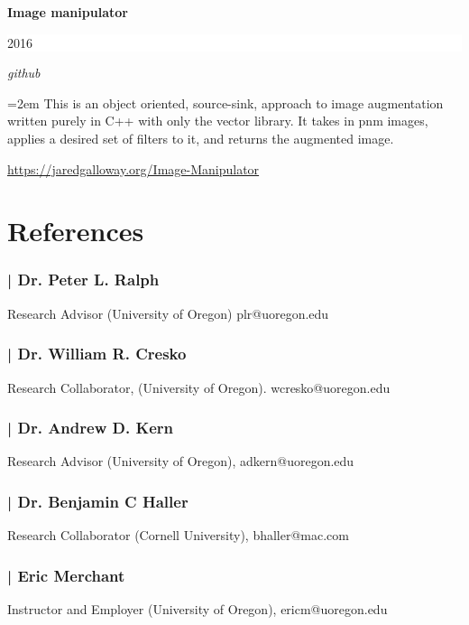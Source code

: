 \documentclass[paper=a4,fontsize=11pt]{scrartcl} %
\newcommand{\sepspace}{\vspace*{1em}}		%
\newcommand{\EducationEntry}[4]{
		\noindent \textbf{#1} \hfill      %
		\colorbox{White}{%
			\parbox{6em}{%
			\hfill\color{Black}#2}} \par  %
		\noindent \textit{#3} \par        %
		\noindent\hangindent=2em\hangafter=0 \small #4 %
		\normalsize \par}
\begin{document}
\EducationEntry{Image manipulator}{2016}{github}
{This is an object oriented, source-sink, approach to image augmentation written purely in C++ with only the vector library.
It takes in pnm images, applies a desired set of filters to it, and returns the augmented image. 
}
\url{https://jaredgalloway.org/Image-Manipulator}
\sepspace


\section*{References}

\subsubsection*{| Dr. Peter L. Ralph} 
\begin{center}
Research Advisor (University of Oregon) 
plr@uoregon.edu
\end{center}

\subsubsection*{| Dr. William R. Cresko}  
\begin{center}
Research Collaborator, (University of Oregon).
wcresko@uoregon.edu
\end{center}

\subsubsection*{| Dr. Andrew D. Kern}
\begin{center}
Research Advisor (University of Oregon),
adkern@uoregon.edu
\end{center}

\subsubsection*{| Dr. Benjamin C Haller} 
\begin{center}
Research Collaborator (Cornell University),
bhaller@mac.com
\end{center}

\subsubsection*{| Eric Merchant} 
\begin{center}
Instructor and Employer (University of Oregon), 
ericm@uoregon.edu
\end{center}
\end{document}
